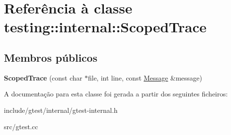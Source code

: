 \hypertarget{classtesting_1_1internal_1_1ScopedTrace}{\section{Referência à classe testing\-:\-:internal\-:\-:Scoped\-Trace}
\label{classtesting_1_1internal_1_1ScopedTrace}
}
\subsection*{Membros públicos}
\begin{DoxyCompactItemize}
\item 
\hypertarget{classtesting_1_1internal_1_1ScopedTrace_ab965d7010bbbc82c1bef6ebf8748bede}{{\bfseries Scoped\-Trace} (const char $\ast$file, int line, const \hyperlink{classtesting_1_1Message}{Message} \&message)}\label{classtesting_1_1internal_1_1ScopedTrace_ab965d7010bbbc82c1bef6ebf8748bede}

\end{DoxyCompactItemize}


A documentação para esta classe foi gerada a partir dos seguintes ficheiros\-:\begin{DoxyCompactItemize}
\item 
include/gtest/internal/gtest-\/internal.\-h\item 
src/gtest.\-cc\end{DoxyCompactItemize}
